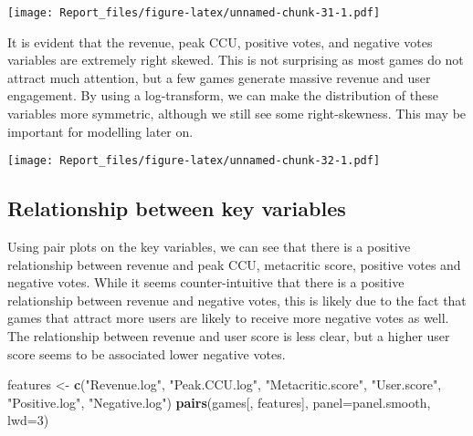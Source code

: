 \documentclass[
]{article}
\newenvironment{Shaded}{\begin{snugshade}}{\end{snugshade}}
\newcommand{\AttributeTok}[1]{\textcolor[rgb]{0.13,0.29,0.53}{#1}}
\newcommand{\DecValTok}[1]{\textcolor[rgb]{0.00,0.00,0.81}{#1}}
\newcommand{\FunctionTok}[1]{\textcolor[rgb]{0.13,0.29,0.53}{\textbf{#1}}}
\newcommand{\NormalTok}[1]{#1}
\newcommand{\OtherTok}[1]{\textcolor[rgb]{0.56,0.35,0.01}{#1}}
\newcommand{\SpecialCharTok}[1]{\textcolor[rgb]{0.81,0.36,0.00}{\textbf{#1}}}
\newcommand{\StringTok}[1]{\textcolor[rgb]{0.31,0.60,0.02}{#1}}
\begin{document}
\texttt{[image: Report\_files/figure-latex/unnamed-chunk-31-1.pdf]}

It is evident that the revenue, peak CCU, positive votes, and negative
votes variables are extremely right skewed. This is not surprising as
most games do not attract much attention, but a few games generate
massive revenue and user engagement. By using a log-transform, we can
make the distribution of these variables more symmetric, although we
still see some right-skewness. This may be important for modelling later
on.

\begin{Shaded}
\end{Shaded}

\texttt{[image: Report\_files/figure-latex/unnamed-chunk-32-1.pdf]}

\hypertarget{relationship-between-key-variables}{%
\subsection{Relationship between key
variables}\label{relationship-between-key-variables}}

Using pair plots on the key variables, we can see that there is a
positive relationship between revenue and peak CCU, metacritic score,
positive votes and negative votes. While it seems counter-intuitive that
there is a positive relationship between revenue and negative votes,
this is likely due to the fact that games that attract more users are
likely to receive more negative votes as well. The relationship between
revenue and user score is less clear, but a higher user score seems to
be associated lower negative votes.

\begin{Shaded}
\begin{Highlighting}[]
\NormalTok{features }\OtherTok{\textless{}{-}} \FunctionTok{c}\NormalTok{(}\StringTok{"Revenue.log"}\NormalTok{, }\StringTok{"Peak.CCU.log"}\NormalTok{, }\StringTok{"Metacritic.score"}\NormalTok{, }\StringTok{"User.score"}\NormalTok{, }\StringTok{"Positive.log"}\NormalTok{, }\StringTok{"Negative.log"}\NormalTok{)}
\FunctionTok{pairs}\NormalTok{(games[, features], }\AttributeTok{panel=}\NormalTok{panel.smooth, }\AttributeTok{lwd=}\DecValTok{3}\NormalTok{)}
\end{Highlighting}
\end{Shaded}
\end{document}
